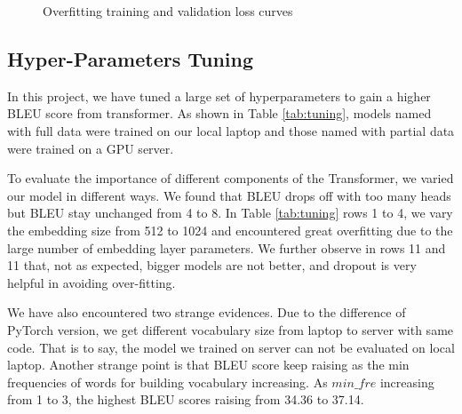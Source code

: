 \documentclass{article}
\begin{document}
\begin{figure}[H]
    \centering
    \quad
    \caption{Overfitting training and validation loss curves}
    \label{fig: overfit}
\end{figure}


\subsection{Hyper-Parameters Tuning}

In this project, we have tuned a large set of hyperparameters to gain a higher BLEU score from transformer. As shown in Table \ref{tab:tuning}, models named with full data were trained on our local laptop and those named with partial data were trained on a GPU server. 

To evaluate the importance of different components of the Transformer, we varied our model in different ways. We found that BLEU drops off with too many heads but BLEU stay unchanged from 4 to 8.
In Table \ref{tab:tuning} rows 1 to 4, we vary the embedding size from 512 to 1024 and encountered great overfitting due to the large number of embedding layer parameters.
We further observe in rows 11 and 11 that, not as expected, bigger models are not better, and dropout is very helpful in avoiding over-fitting.

We have also encountered two strange evidences.
Due to the difference of PyTorch version, we get different vocabulary size from laptop to server with same code. That is to say, the model we trained on server can not be evaluated on local laptop. 
Another strange point is that BLEU score keep raising as the min frequencies of words for building vocabulary increasing. As $min\_fre$ increasing from 1 to 3, the highest BLEU scores raising from 34.36 to 37.14.
\end{document}
